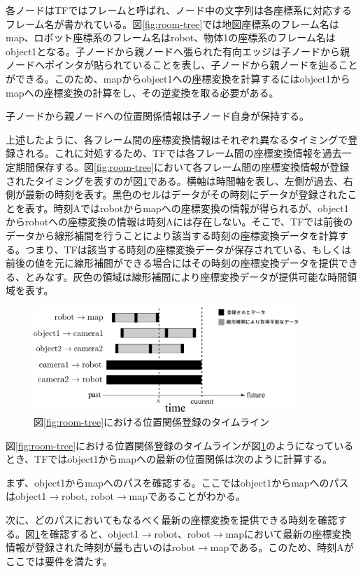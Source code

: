 \documentclass[a4paper]{jreport}	%
\begin{document}
各ノードはTFではフレームと呼ばれ、ノード中の文字列は各座標系に対応するフレーム名が書かれている。図\ref{fig:room-tree}では地図座標系のフレーム名はmap、ロボット座標系のフレーム名はrobot、物体1の座標系のフレーム名はobject1となる。子ノードから親ノードへ張られた有向エッジは子ノードから親ノードへポインタが貼られていることを表し、子ノードから親ノードを辿ることができる。このため、mapからobject1への座標変換を計算するにはobject1からmapへの座標変換の計算をし、その逆変換を取る必要がある。

子ノードから親ノードへの位置関係情報は子ノード自身が保持する。

上述したように、各フレーム間の座標変換情報はそれぞれ異なるタイミングで登録される。これに対処するため、TFでは各フレーム間の座標変換情報を過去一定期間保存する。図\ref{fig:room-tree}において各フレーム間の座標変換情報が登録されたタイミングを表すのが図\ref{fig:room-timeline}である。横軸は時間軸を表し、左側が過去、右側が最新の時刻を表す。黒色のセルはデータがその時刻にデータが登録されたことを表す。時刻Aではrobotからmapへの座標変換の情報が得られるが、object1からrobotへの座標変換の情報は時刻Aには存在しない。そこで、TFでは前後のデータから線形補間を行うことにより該当する時刻の座標変換データを計算する。つまり、TFは該当する時刻の座標変換データが保存されている、もしくは前後の値を元に線形補間ができる場合にはその時刻の座標変換データを提供できる、とみなす。灰色の領域は線形補間により座標変換データが提供可能な時間領域を表す。

\begin{figure}[h] 
\centering
\includegraphics[width=10cm]{room-timeline}	
\caption{図\ref{fig:room-tree}における位置関係登録のタイムライン}
\label{fig:room-timeline}
\end{figure}

図\ref{fig:room-tree}における位置関係登録のタイムラインが図\ref{fig:room-timeline}のようになっているとき、TFではobject1からmapへの最新の位置関係は次のように計算する。

まず、object1からmapへのパスを確認する。ここではobject1からmapへのパスはobject1$\rightarrow$robot, robot$\rightarrow$mapであることがわかる。

次に、どのパスにおいてもなるべく最新の座標変換を提供できる時刻を確認する。図\ref{fig:room-timeline}を確認すると、object1$\rightarrow$robot、robot$\rightarrow$mapにおいて最新の座標変換情報が登録された時刻が最も古いのはrobot$\rightarrow$mapである。このため、時刻Aがここでは要件を満たす。
\end{document}
